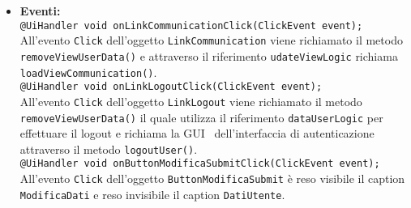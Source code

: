 {\begin{sloppypar}
{{\begin{itemize}
				\texttt{+ void setLabel(Vector<String> data);}\\
				Imposta e rende visibili le \texttt{Label} con i dati attuali dell'utente contenuti nel vettore \texttt{data}.\\
				
				\texttt{- void graphicInitialCharge();}\\
				Imposta la GUI\g~ di gestione dei dati utente allo stato iniziale. Tale stato è il seguente:
				\begin{itemize}
					\item[-] \texttt{DatiUtente}: visibile;
					\item[-] \texttt{ModificaDati}: non visibile;
					\item[-] tutte le \texttt{LabelError}: non visibili;
				\end{itemize}
				Inoltre, attraverso il riferimento \texttt{showData}, richiama il metodo \texttt{dataRequest()} che crea una richiesta per ottenere i dati dell'utente.\\

				\texttt{+ void windowClosing();}\\
				Gestisce l'evento di chiusura della finestra della GUI\g~ di gestione dei dati. Richiama il metodo \texttt{logoutUser()} attraverso il riferimento \texttt{dataUserLogic}.\\
				
			\item[] \textbf{Eventi:}\\
				\texttt{@UiHandler void onLinkCommunicationClick(ClickEvent event);}\\
				All'evento \texttt{Click} dell'oggetto \texttt{LinkCommunication} viene richiamato il metodo \texttt{removeViewUserData()} e attraverso il riferimento \texttt{udateViewLogic} richiama \texttt{loadViewCommunication()}.\\
				
				\texttt{@UiHandler void onLinkLogoutClick(ClickEvent event);}\\
				All'evento \texttt{Click} dell'oggetto \texttt{LinkLogout} viene richiamato il metodo \texttt{removeViewUserData()} il quale utilizza il riferimento \texttt{dataUserLogic} per effettuare il logout e richiama la GUI\g~ dell'interfaccia di autenticazione attraverso il metodo \texttt{logoutUser()}.\\

				\texttt{@UiHandler void onButtonModificaSubmitClick(ClickEvent event);}\\
				All'evento \texttt{Click} dell'oggetto \texttt{ButtonModificaSubmit} è reso visibile il caption \texttt{ModificaDati} e reso invisibile il caption \texttt{DatiUtente}.\\
				

\end{itemize}}}
\end{sloppypar}}
